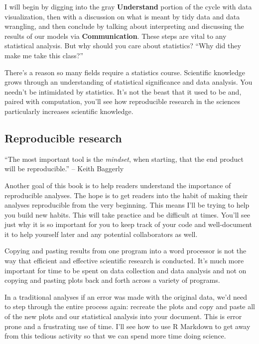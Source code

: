 \documentclass[
  12pt, krantz2,
]{krantz}
\renewenvironment{quote}{\begin{VF}}{\end{VF}}
\begin{document}
I will begin by digging into the gray \textbf{Understand} portion of the cycle with data visualization, then with a discussion on what is meant by tidy data and data wrangling, and then conclude by talking about interpreting and discussing the results of our models via \textbf{Communication}. These steps are vital to any statistical analysis. But why should you care about statistics? ``Why did they make me take this class?''

There's a reason so many fields require a statistics course. Scientific knowledge grows through an understanding of statistical significance and data analysis. You needn't be intimidated by statistics. It's not the beast that it used to be and, paired with computation, you'll see how reproducible research in the sciences particularly increases scientific knowledge.

\hypertarget{subsec:reproducible}{%
\subsection{Reproducible research}\label{subsec:reproducible}}

\begin{quote}
``The most important tool is the \emph{mindset}, when starting, that the end product will be reproducible.'' -- Keith Baggerly
\end{quote}

Another goal of this book is to help readers understand the importance of reproducible analyses. The hope is to get readers into the habit of making their analyses reproducible from the very beginning. This means I'll be trying to help you build new habits. This will take practice and be difficult at times. You'll see just why it is so important for you to keep track of your code and well-document it to help yourself later and any potential collaborators as well.

Copying and pasting results from one program into a word processor is not the way that efficient and effective scientific research is conducted. It's much more important for time to be spent on data collection and data analysis and not on copying and pasting plots back and forth across a variety of programs.

In a traditional analyses if an error was made with the original data, we'd need to step through the entire process again: recreate the plots and copy and paste all of the new plots and our statistical analysis into your document. This is error prone and a frustrating use of time. I'll see how to use R Markdown to get away from this tedious activity so that we can spend more time doing science.
\end{document}
